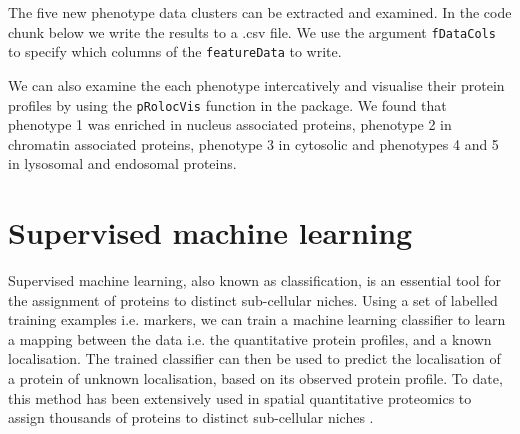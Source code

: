 The five new phenotype data clusters can be extracted and examined.
In the code chunk below we write the results to a .csv file. We use
the argument \texttt{fDataCols} to specify which columns of the
\texttt{featureData} to write.

\begin{knitrout}
\color{fgcolor}\begin{kframe}
\begin{alltt}
\hlopt{$} \hlkwb{<-} \hlstd{(}\hlopt{$}
  \hlstd{=} \hlstd{,}  \hlstd{=} \hlstd{,}  \hlstd{=} \hlstd{)}
\end{alltt}
\end{kframe}
\end{knitrout}

We can also examine the each phenotype intercatively and visualise
their protein profiles by using the \texttt{pRolocVis} function in the
 package. We found that phenotype 1 was
enriched in nucleus associated proteins, phenotype 2 in chromatin
associated proteins, phenotype 3 in cytosolic and phenotypes 4 and 5
in lysosomal and endosomal proteins.

\begin{knitrout}
\color{fgcolor}\begin{kframe}
\begin{alltt}
  \hlstd{=} \hlstd{)}
\end{alltt}
\end{kframe}
\end{knitrout}

\section*{Supervised machine learning}

Supervised machine learning, also known as classification, is an
essential tool for the assignment of proteins to distinct sub-cellular
niches. Using a set of labelled training examples i.e. markers, we can
train a machine learning classifier to learn a mapping between the
data i.e. the quantitative protein profiles, and a known localisation.
The trained classifier can then be used to predict the localisation of
a protein of unknown localisation, based on its observed protein
profile. To date, this method has been extensively used in spatial
quantitative proteomics to assign thousands of proteins to distinct
sub-cellular niches
\cite{hyper,Groen:2014,Trotter:2010,Hall:2009,Dunkley:2006,Tan:2009}.

